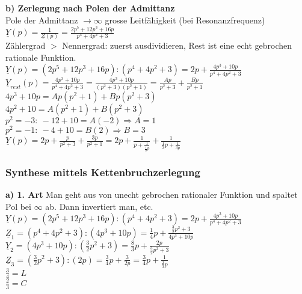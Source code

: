 \textbf{b) Zerlegung nach Polen der Admittanz}\\
Pole der Admittanz $\rightarrow \infty$ grosse Leitfähigkeit (bei
Resonanzfrequenz)\\
$\underline{Y}(p)=\frac{1}{\underline{Z}(p)}=\frac{2p^5+12p^3+16p}{p^4+4p^2+3}$\\
Zählergrad $>$ Nennergrad: zuerst ausdividieren, Rest ist eine echt gebrochen
rationale Funktion.\\
$\underline{Y}(p)=(2p^5+12p^3+16p):(p^4+4p^2+3)=2p+\frac{4p^3+10p}{p^4+4p^2+3}$\\
$\underline{Y}_{rest}(p)=\frac{4p^3+10p}{p^4+4p^2+3}=\frac{4p^3+10p}{(p^2+3)(p^2+1)}=\frac{Ap}{p^2+3}+\frac{Bp}{p^2+1}$\\
$4p^3+10p=Ap(p^2+1)+Bp(p^2+3)$\\
$4p^2+10=A(p^2+1)+B(p^2+3)$\\
$p^2=-3:\ -12+10=A(-2) \Rightarrow A=1$\\
$p^2=-1:\ -4+10=B(2) \Rightarrow B=3$\\
$\underline{Y}(p)=2p+\frac{p}{p^2+3}+\frac{3p}{p^2+1}=2p+\frac{1}{p+\frac{1}{\frac{1}{3}p}}+\frac{1}{\frac{1}{3}p+\frac{1}{3p}}$\\
\subsubsection{Synthese mittels Kettenbruchzerlegung}
\textbf{a) 1. Art} Man geht aus von unecht gebrochen rationaler Funktion und
spaltet Pol bei $\infty$ ab. Dann invertiert man, etc.\\
$\underline{Y}(p)=(2p^5+12p^3+16p):(p^4+4p^2+3)=2p+\frac{4p^3+10p}{p^4+4p^2+3}$\\
$\underline{Z}_1=(p^4+4p^2+3):(4p^3+10p)=\frac{1}{4}p+\frac{\frac{3}{2}p^2+3}{4p^3+10p}$\\
$\underline{Y}_2=(4p^3+10p):(\frac{3}{2}p^2+3)=\frac{8}{3}p+\frac{2p}{\frac{3}{2}p^2+3}$\\
$\underline{Z}_3=(\frac{3}{2}p^2+3):(2p)=\frac{3}{4}p+\frac{3}{2p}=\frac{3}{4}p+\frac{1}{\frac{2}{3}p}$\\
$\frac{3}{4}=L$\\
$\frac{2}{3}=C$\\
%
